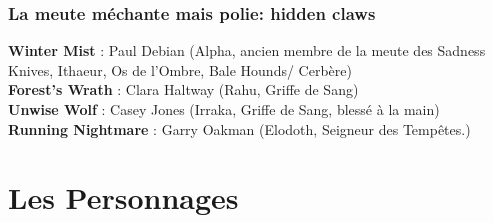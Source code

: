\documentclass[oneside,12pt]{book}
\begin{document}
\begin{flushleft}
\subsection{La meute méchante mais polie: hidden claws}
\label{hiddenclaws}
\textbf{Winter Mist} : Paul Debian (Alpha, ancien membre de la meute des Sadness Knives, Ithaeur, Os de l'Ombre, Bale Hounds/ Cerbère)\\
\textbf{Forest’s Wrath} : Clara Haltway (Rahu, Griffe de Sang) \\
\textbf{Unwise Wolf} : Casey Jones (Irraka, Griffe de Sang, blessé à la main)\\
\textbf{Running Nightmare} : Garry Oakman (Elodoth, Seigneur des Tempêtes.) \\



\chapter{Les Personnages}
\clearpage

\end{flushleft}
\end{document}
